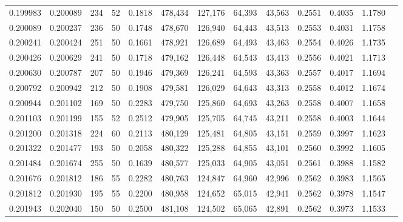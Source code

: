 \begin{tabular}{rrrrrrrrrrrrr}
0.199983 & 0.200089 &   234 &  52 &                                     0.1818 & 478,434 & 127,176 &  64,393 &  43,563 & 0.2551 & 0.4035 & 1.1780 \\
0.200089 & 0.200237 &   236 &  50 &                                     0.1748 & 478,670 & 126,940 &  64,443 &  43,513 & 0.2553 & 0.4031 & 1.1758 \\
0.200241 & 0.200424 &   251 &  50 &                                     0.1661 & 478,921 & 126,689 &  64,493 &  43,463 & 0.2554 & 0.4026 & 1.1735 \\
0.200426 & 0.200629 &   241 &  50 &                                     0.1718 & 479,162 & 126,448 &  64,543 &  43,413 & 0.2556 & 0.4021 & 1.1713 \\
0.200630 & 0.200787 &   207 &  50 &                                     0.1946 & 479,369 & 126,241 &  64,593 &  43,363 & 0.2557 & 0.4017 & 1.1694 \\
0.200792 & 0.200942 &   212 &  50 &                                     0.1908 & 479,581 & 126,029 &  64,643 &  43,313 & 0.2558 & 0.4012 & 1.1674 \\
0.200944 & 0.201102 &   169 &  50 &                                     0.2283 & 479,750 & 125,860 &  64,693 &  43,263 & 0.2558 & 0.4007 & 1.1658 \\
0.201103 & 0.201199 &   155 &  52 &                                     0.2512 & 479,905 & 125,705 &  64,745 &  43,211 & 0.2558 & 0.4003 & 1.1644 \\
0.201200 & 0.201318 &   224 &  60 &                                     0.2113 & 480,129 & 125,481 &  64,805 &  43,151 & 0.2559 & 0.3997 & 1.1623 \\
0.201322 & 0.201477 &   193 &  50 &                                     0.2058 & 480,322 & 125,288 &  64,855 &  43,101 & 0.2560 & 0.3992 & 1.1605 \\
0.201484 & 0.201674 &   255 &  50 &                                     0.1639 & 480,577 & 125,033 &  64,905 &  43,051 & 0.2561 & 0.3988 & 1.1582 \\
0.201676 & 0.201812 &   186 &  55 &                                     0.2282 & 480,763 & 124,847 &  64,960 &  42,996 & 0.2562 & 0.3983 & 1.1565 \\
0.201812 & 0.201930 &   195 &  55 &                                     0.2200 & 480,958 & 124,652 &  65,015 &  42,941 & 0.2562 & 0.3978 & 1.1547 \\
0.201943 & 0.202040 &   150 &  50 &                                     0.2500 & 481,108 & 124,502 &  65,065 &  42,891 & 0.2562 & 0.3973 & 1.1533 \\

\end{tabular}
